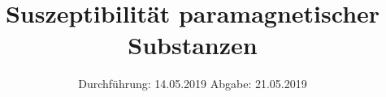 

\subject{V606}
\title{Suszeptibilität paramagnetischer Substanzen}
\date{%
  Durchführung: 14.05.2019
  \hspace{3em}
  Abgabe: 21.05.2019
}



\maketitle
\thispagestyle{empty}
\tableofcontents
\newpage






\printbibliography{}


